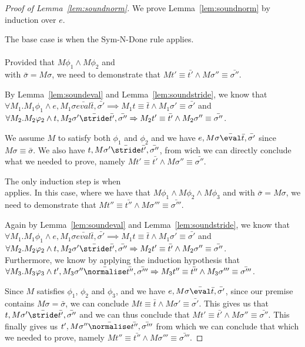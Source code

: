 \begin{proof}[Proof of Lemma~\ref{lem:soundnorm}]
  We prove Lemma~\ref{lem:soundnorm} by induction over $e$.

  The base case is when the Sym-N-Done rule applies.\\
  \\

  Provided that $M\phi_1\land M\phi_2$ and\\
   with $\bar{\sigma}=M\sigma$,
  we need to demonstrate that $M t'\equiv \bar{t'}\land M\sigma''\equiv \bar{\sigma''}$.

  By Lemma~\ref{lem:soundeval} and Lemma~\ref{lem:soundstride}, we know that\\
  $\forall M_1. M_1\phi_1 \land e,M_1\sigma \bar{eval}\bar{t},\bar{\sigma'}\implies M_1 t \equiv \bar{t} \land M_1 \sigma'\equiv \bar{\sigma'}$ and\\
  $\forall M_2.M_2\phi_2\land t,M_2\sigma'\bar{\stride}\bar{t'},\bar{\sigma''}\implies M_2 t'\equiv\bar{t'}\land M_2\sigma''\equiv \bar{\sigma''}$.

  We assume $M$ to satisfy both $\phi_1$ and $\phi_2$ and we have $e,M\sigma \bar{\eval}\bar{t},\bar{\sigma'}$ since $M\sigma\equiv \bar{\sigma}$.
  We also have $t,M\sigma'\bar{\stride}\bar{t'},\bar{\sigma''}$,
  from wich we can directly conclude what we needed to prove,
  namely $M t'\equiv \bar{t'}\land M\sigma''\equiv \bar{\sigma''}$.

  The only induction step is when\\
   applies.
  In this case, where we have that $M\phi_1\land M\phi_2 \land M\phi_3$ and  with $\bar{\sigma}=M\sigma$,
  we need to demonstrate that $M t''\equiv \bar{t''}\land M\sigma'''\equiv \bar{\sigma'''}$.

  Again by Lemma~\ref{lem:soundeval} and Lemma~\ref{lem:soundstride}, we know that\\
  $\forall M_1. M_1\phi_1 \land e,M_1\sigma \bar{eval}\bar{t},\bar{\sigma'}\implies M_1 t \equiv \bar{t} \land M_1 \sigma'\equiv \bar{\sigma'}$ and\\
  $\forall M_2.M_2\phi_2\land t,M_2\sigma'\bar{\stride}\bar{t'},\bar{\sigma''}\implies M_2 t'\equiv\bar{t'}\land M_2\sigma''\equiv \bar{\sigma''}$.\\
  Furthermore, we know by applying the induction hypothesis that $\forall M_3.M_3\phi_3 \land t',M_3\sigma''\bar{\normalise} \bar{t''},\bar{\sigma'''}\implies M_3 t''\equiv \bar{t''}\land M_3 \sigma'''\equiv \bar{\sigma'''}$.

  Since $M$ satisfies $\phi_1$, $\phi_2$ and $\phi_3$, and we have $e,M\sigma \bar{\eval}\bar{t},\bar{\sigma'}$, since our premise contains $M\sigma = \bar{\sigma}$, we can conclude $M t \equiv \bar{t} \land M \sigma'\equiv \bar{\sigma'}$.
  This gives us that $t,M\sigma'\bar{\stride}\bar{t'},\bar{\sigma''}$ and we can thus conclude that $M t'\equiv\bar{t'}\land M\sigma''\equiv \bar{\sigma''}$.
  This finally gives us $t',M\sigma''\bar{\normalise} \bar{t''},\bar{\sigma'''}$ from which we can conclude that which we needed to prove,
  namely $M t''\equiv \bar{t''}\land M\sigma'''\equiv \bar{\sigma'''}$.
\end{proof}
